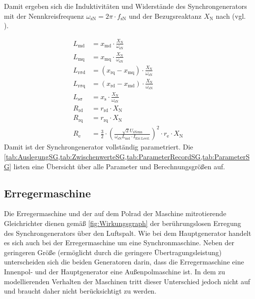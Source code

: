Damit ergeben sich die Induktivitäten und Widerstände des Synchrongenerators mit der Nennkreisfrequenz \(\omega_{\mathrm{sN}}=2\pi\cdot f_{\mathrm{sN}}\) und der Bezugsreaktanz \(X_{\mathrm{N}}\) nach  (vgl. \cite[S.265f.]{kralModelicaObjektorientierteModellbildung2019}).

\begin{align}
	L_{\mathrm{md}} &= x_{\mathrm{md}}\cdot \frac{X_{\mathrm{N}}}{\omega_{\mathrm{sN}}} \label{eq:LmgSG}\\
	L_{\mathrm{mq}} &= x_{\mathrm{mq}}\cdot \frac{X_{\mathrm{N}}}{\omega_{\mathrm{sN}}} \\
	L_{\mathrm{r \sigma d}} &= (x_{\mathrm{rq}}-x_{\mathrm{mq}})\cdot \frac{X_{\mathrm{N}}}{\omega_{\mathrm{sN}}} \\
	L_{\mathrm{r \sigma q}} &= (x_{\mathrm{rd}}-x_{\mathrm{md}})\cdot \frac{X_{\mathrm{N}}}{\omega_{\mathrm{sN}}} \\
	L_{\mathrm{s \sigma}} &= x_{\mathrm{s}}\cdot \frac{X_{\mathrm{N}}}{\omega_{\mathrm{sN}}} \\
	R_{\mathrm{rd}} &= r_{\mathrm{rd}}\cdot X_{\mathrm{N}} \\
	R_{\mathrm{rq}} &= r_{\mathrm{rq}}\cdot X_{\mathrm{N}} \\
	R_{\mathrm{e}} &= \frac{3}{2}\cdot \left(\frac{\sqrt{2}U_{\mathrm{sNenn}}}{\omega_{\mathrm{sN}}L_{\mathrm{md}}\cdot I_{\mathrm{Err. Leerl.}}}\right)^2\cdot r_{\mathrm{e}}\cdot X_{\mathrm{N}}\label{eq:ReSG}
\end{align}
Damit ist der Synchrongenerator vollständig parametriert. Die \cref{tab:AuslegungSG,tab:ZwischenwerteSG,tab:ParameterRecordSG,tab:ParameterSG} listen eine Übersicht über alle Parameter und Berechnungsgrößen auf.

\subsection{Erregermaschine}\label{sec:erregermaschine}

Die Erregermaschine und der auf dem Polrad der Maschine mitrotierende Gleichrichter dienen gemäß \cref{fig:Wirkungsgraph} der berührungslosen Erregung des Synchrongenerators über den Luftspalt. Wie bei dem Hauptgenerator handelt es sich auch bei der Erregermaschine um eine Synchronmaschine. Neben der geringeren Größe (ermöglicht durch die geringere Übertragungsleistung) unterscheiden sich die beiden Generatoren darin, dass die Erregermaschine eine Innenpol- und der Hauptgenerator eine Außenpolmaschine ist. In dem zu modellierenden Verhalten der Maschinen tritt dieser Unterschied jedoch nicht auf und braucht daher nicht berücksichtigt zu werden.

